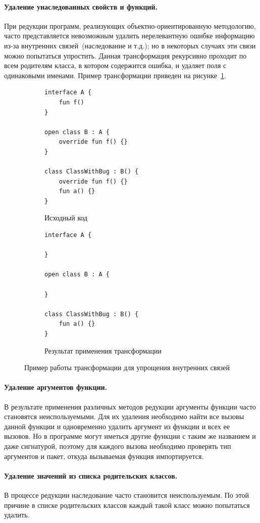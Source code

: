 \paragraph{Удаление унаследованных свойств и функций.} При редукции программ, реализующих объектно-ориентированную методологию, часто представляется невозможным удалить нерелевантную ошибке информацию из-за внутренних связей~(наследование и т.д.); но в некоторых случаях эти связи можно попытаться упростить. Данная трансформация рекурсивно проходит по всем родителям класса, в котором содержится ошибка, и удаляет поля с одинаковыми именами. Пример трансформации приведен на рисунке~\ref{ex:inh}.
%
\begin{figure}
\centering
\begin{subfigure}[t]{\linewidth}
\begin{lstlisting}
interface A {
    fun f()
}

open class B : A {
    override fun f() {}
}

class ClassWithBug : B() {
    override fun f() {}
    fun a() {}
}
\end{lstlisting}
\caption{Исходный код}
\end{subfigure}
\begin{subfigure}[t]{\linewidth}
\begin{lstlisting}
interface A {

}

open class B : A {

}

class ClassWithBug : B() {
    fun a() {}
}
\end{lstlisting}
\caption{Результат применения трансформации}
\end{subfigure}
\caption{\label{ex:inh}Пример работы трансформации для упрощения внутренних связей}
\end{figure}

\paragraph{Удаление аргументов функции.} В результате применения различных методов редукции аргументы функции часто становятся неиспользуемыми. Для их удаления необходимо найти все вызовы данной функции и одновременно удалить аргумент из функции и всех ее вызовов. Но в программе могут иметься другие функции с таким же названием и даже сигнатурой, поэтому для каждого вызова необходимо проверять тип аргументов и пакет, откуда вызываемая функция импортируется.

\paragraph{Удаление значений из списка родительских классов.} В процессе редукции наследование часто становится неиспользуемым. По этой причине в списке родительских классов каждый такой класс можно попытаться удалить.

